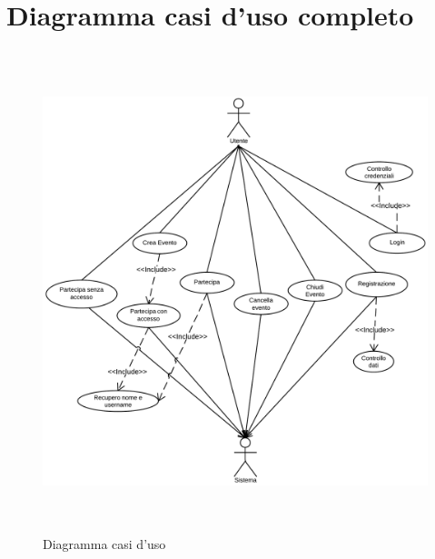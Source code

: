 \section{Diagramma casi d'uso completo}
\begin{figure}[H]
\centering
\includegraphics[width=16cm, height=14cm]{img/use/DiagUsocompleto.png}
\caption{Diagramma casi d'uso}
\label{fig:diagcompl}
\end{figure}




